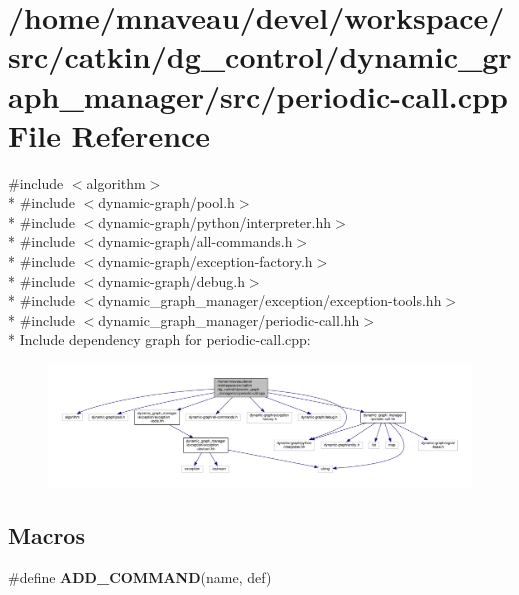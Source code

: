 \hypertarget{periodic-call_8cpp}{}\section{/home/mnaveau/devel/workspace/src/catkin/dg\+\_\+control/dynamic\+\_\+graph\+\_\+manager/src/periodic-\/call.cpp File Reference}
\label{periodic-call_8cpp}
{\ttfamily \#include $<$algorithm$>$}\\*
{\ttfamily \#include $<$dynamic-\/graph/pool.\+h$>$}\\*
{\ttfamily \#include $<$dynamic-\/graph/python/interpreter.\+hh$>$}\\*
{\ttfamily \#include $<$dynamic-\/graph/all-\/commands.\+h$>$}\\*
{\ttfamily \#include $<$dynamic-\/graph/exception-\/factory.\+h$>$}\\*
{\ttfamily \#include $<$dynamic-\/graph/debug.\+h$>$}\\*
{\ttfamily \#include $<$dynamic\+\_\+graph\+\_\+manager/exception/exception-\/tools.\+hh$>$}\\*
{\ttfamily \#include $<$dynamic\+\_\+graph\+\_\+manager/periodic-\/call.\+hh$>$}\\*
Include dependency graph for periodic-\/call.cpp\+:\nopagebreak
\begin{figure}[H]
\begin{center}
\leavevmode
\includegraphics[width=350pt]{periodic-call_8cpp__incl}
\end{center}
\end{figure}
\subsection*{Macros}
\begin{DoxyCompactItemize}
\item 
\#define {\bfseries A\+D\+D\+\_\+\+C\+O\+M\+M\+A\+ND}(name,  def)
\end{DoxyCompactItemize}
